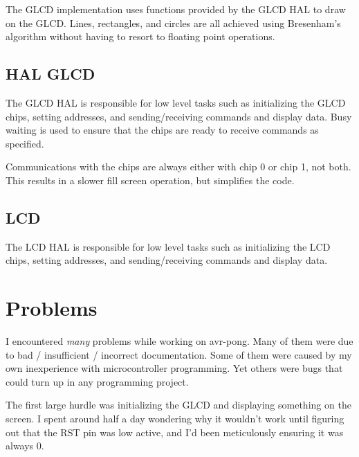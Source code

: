 \documentclass[12pt,a4paper,titlepage,oneside]{article}
\begin{document}
The GLCD implementation uses functions provided by the GLCD HAL to
draw on the GLCD. Lines, rectangles, and circles are all achieved using
Bresenham's algorithm without having to resort to floating point operations.

\subsection{HAL GLCD}

The GLCD HAL is responsible for low level tasks such as initializing the
GLCD chips, setting addresses, and sending/receiving commands and display
data. Busy waiting is used to ensure that the chips are ready to receive
commands as specified.

Communications with the chips are always either with chip 0 or chip 1,
not both. This results in a slower fill screen operation, but simplifies
the code.

\subsection{LCD}

The LCD HAL is responsible for low level tasks such as initializing the
LCD chips, setting addresses, and sending/receiving commands and display
data.




\section{Problems}

I encountered \emph{many} problems while working on avr-pong. Many of them
were due to bad / insufficient / incorrect documentation. Some of them
were caused by my own inexperience with microcontroller programming. Yet others
were bugs that could turn up in any programming project.

The first large hurdle was initializing the GLCD and displaying something on the
screen. I spent around half a day wondering why it wouldn't work until figuring
out that the RST pin was low active, and I'd been meticulously ensuring it 
was always 0.
\end{document}
